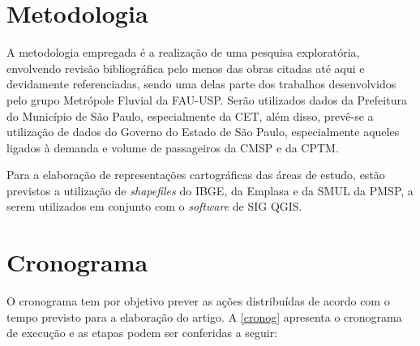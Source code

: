 \documentclass[
	12pt,				%
	openright,			%
	oneside,
	a4paper,			%
	english,			%
	french,				%
	spanish,			%
	brazil,				%
	]{abntex2}
\begin{document}

\chapter{Metodologia}


A metodologia empregada é a realização de uma pesquisa exploratória, envolvendo revisão bibliográfica pelo menos das obras citadas até aqui e devidamente referenciadas, sendo uma delas parte dos trabalhos desenvolvidos pelo grupo Metrópole Fluvial da FAU-USP. Serão utilizados dados da Prefeitura do Município de São Paulo, especialmente da CET, além disso, prevê-se a utilização de dados do Governo do Estado de São Paulo, especialmente aqueles ligados à demanda e volume de passageiros da CMSP e da CPTM.

Para a elaboração de representações cartográficas das áreas de estudo, estão previstos a utilização de \textit{shapefiles} do IBGE, da Emplasa e da SMUL da PMSP, a serem utilizados em conjunto com o \textit{software} de SIG QGIS.


\chapter{Cronograma}


O cronograma tem por objetivo prever as ações distribuídas de acordo com o tempo previsto para a elaboração do artigo. A  \autoref{cronog} apresenta o cronograma de execução e as etapas podem ser conferidas a seguir:
\end{document}

